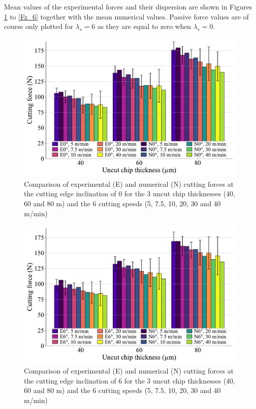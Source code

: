 \documentclass[preprint,12pt,times]{elsarticle}
\begin{document}
Mean values of the experimental forces and their dispersion are shown in Figures \ref{Fx_0} to \ref{Fz_6} together with the mean numerical values. Passive force values are of course only plotted for $\lambda_s = 6$\textdegree{} as they are equal to zero when $\lambda_s = 0$\textdegree{}.

\begin{figure}[!h]
\centering
\includegraphics[width = 140 mm]{Figures/Fx_0}
\caption{Comparison of experimental (E) and numerical (N) cutting forces at the cutting edge inclination of 0\textdegree{} for the 3 uncut chip thicknesses (40, 60 and 80 \textmu{}m) and the 6 cutting speeds (5, 7.5, 10, 20, 30 and 40 m/min)}
\label{Fx_0}
\end{figure}

\begin{figure}[!h]
\centering
\includegraphics[width = 140 mm]{Figures/Fx_6}
\caption{Comparison of experimental (E) and numerical (N) cutting forces at the cutting edge inclination of 6\textdegree{} for the 3 uncut chip thicknesses (40, 60 and 80 \textmu{}m) and the 6 cutting speeds (5, 7.5, 10, 20, 30 and 40 m/min)}
\label{Fx_6}
\end{figure}
\end{document}

